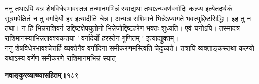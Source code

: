 \documentclass[11pt, openany]{book}
\begin{document}
\begin{sloppypar}
\hangindent=0.2in \hspace{0.2in}ननु तथाऽपि यत्र शेषविधेरभावस्तत्र तन्मानमभिन्नं स्याद्यथा तथाऽन्यवर्णवर्गादिः कल्प्य इत्येतदर्थकं सूत्रमपेक्षितं न तु वर्गादेर्यो हर इत्यादीति चेन्न। अन्यत्र राशिमाने भिन्नेऽप्यागते भवत्युद्दिष्टसिद्धिः। इह तु न तथा। न हि भिन्नराशिवर्ग उद्दिष्टक्षेपयुतोनो भिन्नेजोद्दिष्टहरेण भक्तः शुध्यति। एवं घनोऽपि। तस्मादत्र राशिमानस्याभिन्नतावश्यकतया ' वर्गादेर्यो हरस्तेन गुणितम् ' इत्याद्युक्तम्।\\

\hangindent=0.2in \hspace{0.2in}ननु शेषविधेरभावश्चेत्तर्हि व्यक्तेनैव वर्गादिना समीकरणमस्त्विति चेदुच्यते। तत्रापि व्यक्ताङ्कस्तथा कल्प्यो यथाऽस्य वर्गेण समीकरणे राशिमानमभिन्नं स्यात्।
\end{sloppypar}
\thispagestyle{empty}
\newpage

\onehalfspacing
\hspace{2in}\textbf{नवाङ्कुरव्याख्यासहितम्।}\hspace{2in}१८९

\vspace{5mm}
\end{document}
